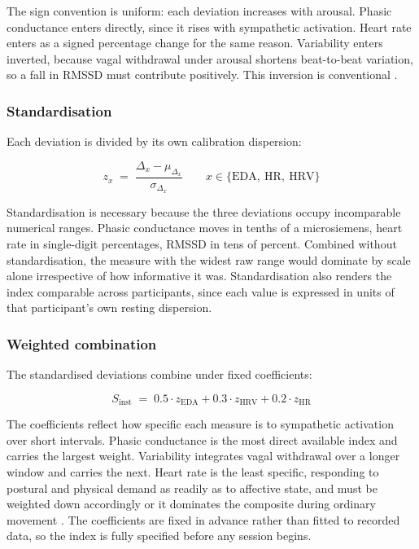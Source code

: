 The sign convention is uniform: each deviation increases with
arousal. Phasic conductance enters directly, since it rises with
sympathetic activation. Heart rate enters as a signed percentage
change for the same reason. Variability enters inverted, because
vagal withdrawal under arousal shortens beat-to-beat variation,
so a fall in RMSSD must contribute positively. This inversion is
conventional \citep{kim2018, kreibig2010, thayer2012}.

\subsubsection{Standardisation}

Each deviation is divided by its own calibration dispersion:

\begin{equation}
z_{x} \;=\; \frac{\Delta_{x} - \mu_{\Delta_{x}}}{\sigma_{\Delta_{x}}}
\qquad x \in \{\mathrm{EDA},\ \mathrm{HR},\ \mathrm{HRV}\}
\end{equation}

Standardisation is necessary because the three deviations occupy
incomparable numerical ranges. Phasic conductance moves in tenths
of a microsiemens, heart rate in single-digit percentages, RMSSD
in tens of percent. Combined without standardisation, the measure
with the widest raw range would dominate by scale alone
irrespective of how informative it was. Standardisation also
renders the index comparable across participants, since each
value is expressed in units of that participant's own resting
dispersion.

\subsubsection{Weighted combination}

The standardised deviations combine under fixed coefficients:

\begin{equation}
S_{\mathrm{inst}} \;=\; 0.5 \cdot z_{\mathrm{EDA}}
+ 0.3 \cdot z_{\mathrm{HRV}}
+ 0.2 \cdot z_{\mathrm{HR}}
\end{equation}

The coefficients reflect how specific each measure is to
sympathetic activation over short intervals. Phasic conductance
is the most direct available index and carries the largest
weight. Variability integrates vagal withdrawal over a longer
window and carries the next. Heart rate is the least specific,
responding to postural and physical demand as readily as to
affective state, and must be weighted down accordingly or it
dominates the composite during ordinary movement
\citep{healey2005, sano2013}. The coefficients are fixed in
advance rather than fitted to recorded data, so the index is fully
specified before any session begins.

